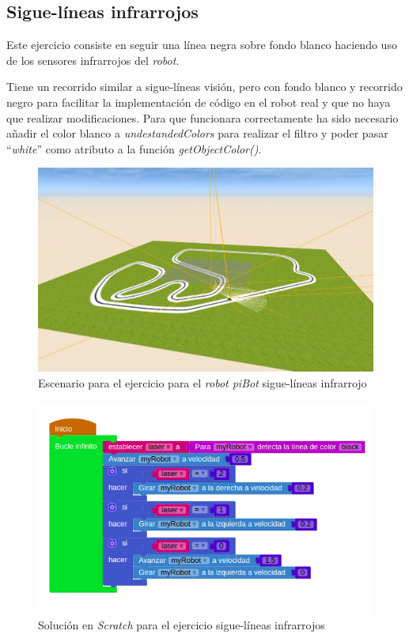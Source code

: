 \subsection{Sigue-líneas infrarrojos}
     Este ejercicio consiste en seguir una línea negra sobre fondo blanco haciendo uso de los sensores infrarrojos del \textit{robot}. 
     
    Tiene un recorrido similar a sigue-líneas visión, pero con fondo blanco y recorrido negro para facilitar la implementación de código en el robot real y que no haya que realizar modificaciones. Para que funcionara correctamente ha sido necesario añadir el color blanco a \textit{undestandedColors} para realizar el filtro y poder pasar ``\textit{white}'' como atributo a la función \textit{getObjectColor()}.
    
    \begin{figure}[H]
    \centering
    \includegraphics[scale=0.35]{img/siguelineas_ir.JPG}
    \caption{Escenario para el ejercicio para el  \textit{robot piBot} sigue-líneas infrarrojo} \label{fig:siguelineasIR}
    \end{figure}
    
           \begin{figure}[H]
    \centering
    \includegraphics[scale=0.5]{img/siguelineaIRcodigo.png}
    \caption{Solución en \textit{Scratch} para el ejercicio sigue-líneas infrarrojos} 
    \label{fig:irSolution}
    \end{figure}
    
